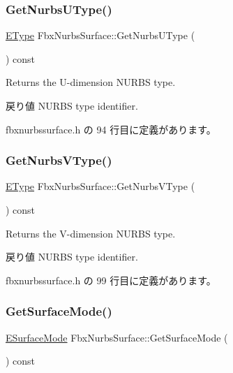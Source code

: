 \subsubsection{\texorpdfstring{Get\+Nurbs\+U\+Type()}{GetNurbsUType()}}
{\footnotesize\ttfamily \hyperlink{class_fbx_nurbs_surface_a87c1fcd98d8fa511ee6c6166346a46b3}{E\+Type} Fbx\+Nurbs\+Surface\+::\+Get\+Nurbs\+U\+Type (\begin{DoxyParamCaption}{ }\end{DoxyParamCaption}) const\hspace{0.3cm}{\ttfamily [inline]}}

Returns the U-\/dimension N\+U\+R\+BS type. \begin{DoxyReturn}{戻り値}
N\+U\+R\+BS type identifier. 
\end{DoxyReturn}


 fbxnurbssurface.\+h の 94 行目に定義があります。

\mbox{\label{class_fbx_nurbs_surface_a8e1f509e97a93380853aa0a009aa7a01}} 
\subsubsection{\texorpdfstring{Get\+Nurbs\+V\+Type()}{GetNurbsVType()}}
{\footnotesize\ttfamily \hyperlink{class_fbx_nurbs_surface_a87c1fcd98d8fa511ee6c6166346a46b3}{E\+Type} Fbx\+Nurbs\+Surface\+::\+Get\+Nurbs\+V\+Type (\begin{DoxyParamCaption}{ }\end{DoxyParamCaption}) const\hspace{0.3cm}{\ttfamily [inline]}}

Returns the V-\/dimension N\+U\+R\+BS type. \begin{DoxyReturn}{戻り値}
N\+U\+R\+BS type identifier. 
\end{DoxyReturn}


 fbxnurbssurface.\+h の 99 行目に定義があります。

\mbox{\label{class_fbx_nurbs_surface_a00e68c448d8dc33a1f2a7f4d8996331e}} 
\subsubsection{\texorpdfstring{Get\+Surface\+Mode()}{GetSurfaceMode()}}
{\footnotesize\ttfamily \hyperlink{class_fbx_geometry_adb9d2e34481a2cb40f1d783c665794db}{E\+Surface\+Mode} Fbx\+Nurbs\+Surface\+::\+Get\+Surface\+Mode (\begin{DoxyParamCaption}{ }\end{DoxyParamCaption}) const\hspace{0.3cm}{\ttfamily [inline]}}

